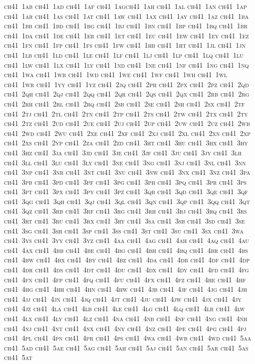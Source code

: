 \documentclass[12pt,a4paper]{article}
\begin{document}
\textsc{\lowercase{%
CH41~1AB	CH41~1AD	CH41~1AF	CH41~1AG\quad{}CH41~1AH	CH41~1AL
CH41~1AN	CH41~1AP	CH41~1AR	CH41~1AS	CH41~1AT	CH41~1AW
CH41~1AX	CH41~1AY	CH41~1AZ	CH41~1BA	CH41~1BB	CH41~1BD
CH41~1BG	CH41~1BJ	CH41~1BN	CH41~1BP	CH41~1BQ	CH41~1BR
CH41~1DA	CH41~1DE	CH41~1ER	CH41~1ET	CH41~1EU	CH41~1EW
CH41~1EY	CH41~1EZ	CH41~1FN	CH41~1FP	CH41~1FS	CH41~1FW
CH41~1HB	CH41~1HT	CH41~1JL	CH41~1JN	CH41~1LB	CH41~1LD
CH41~1LE	CH41~1LF	CH41~1LJ	CH41~1LP	CH41~1LQ	CH41~1LU
CH41~1LW	CH41~1LX	CH41~1LY	CH41~1ND	CH41~1NE	CH41~1NF
CH41~1NG	CH41~1NQ	CH41~1WA	CH41~1WB	CH41~1WD	CH41~1WE
CH41~1WF	CH41~1WH	CH41~1WL	CH41~1WR	CH41~1YY	CH41~1YZ
CH41~2JQ	CH41~2PH	CH41~2PX	CH41~2PZ	CH41~2QD	CH41~2QH
CH41~2QJ	CH41~2QQ	CH41~2QR	CH41~2QS	CH41~2QX	CH41~2RB
CH41~2RG	CH41~2RH	CH41~2RL	CH41~2RQ	CH41~2SB	CH41~2SE
CH41~2SH	CH41~2SX	CH41~2TF	CH41~2TJ	CH41~2TL	CH41~2TN
CH41~2TP	CH41~2TS	CH41~2TW	CH41~2TX	CH41~2TY	CH41~2TZ
CH41~2UD	CH41~2UE	CH41~2UJ	CH41~2UP	CH41~2UW	CH41~2UZ
CH41~2WB	CH41~2WD	CH41~2WU	CH41~2XE	CH41~2XF	CH41~2XJ
CH41~2XL	CH41~2XN	CH41~2XP	CH41~2XS	CH41~2YP	CH41~2ZA
CH41~2ZD	CH41~3HT	CH41~3HU	CH41~3HX	CH41~3HY	CH41~3HZ
CH41~3JA	CH41~3JD	CH41~3JE	CH41~3JF	CH41~3JU	CH41~3JY
CH41~3LH	CH41~3LL	CH41~3LU	CH41~3LY	CH41~3NE	CH41~3NG
CH41~3NJ	CH41~3NL	CH41~3NN	CH41~3NP	CH41~3NR	CH41~3NT
CH41~3NU	CH41~3NW	CH41~3NX	CH41~3NZ	CH41~3PA	CH41~3PB
CH41~3PD	CH41~3PF	CH41~3PG	CH41~3PH	CH41~3PQ	CH41~3PR
CH41~3PS	CH41~3PT	CH41~3PX	CH41~3PY	CH41~3PZ	CH41~3QB
CH41~3QD	CH41~3QE	CH41~3QF	CH41~3QG	CH41~3QH	CH41~3QJ
CH41~3QL	CH41~3QN	CH41~3QP	CH41~3QQ	CH41~3QT	CH41~3QZ
CH41~3RB	CH41~3RF	CH41~3RG	CH41~3RH	CH41~3RJ	CH41~3RQ
CH41~3RS	CH41~3RT	CH41~3RU	CH41~3RX	CH41~3RY	CH41~3SA
CH41~3SB	CH41~3SD	CH41~3SE	CH41~3SG	CH41~3SH	CH41~3SP
CH41~3SS	CH41~3ST	CH41~3SU	CH41~3SX	CH41~3WA	CH41~3YS
CH41~3YY	CH41~3YZ	CH41~4AA	CH41~4AG	CH41~4AH	CH41~4AQ
CH41~4AU	CH41~4AX	CH41~4BB	CH41~4BE	CH41~4BG	CH41~4BH
CH41~4BQ	CH41~4BR	CH41~4BS	CH41~4BW	CH41~4BX	CH41~4BY
CH41~4BZ	CH41~4DA	CH41~4DB	CH41~4DF	CH41~4DP	CH41~4DR
CH41~4DS	CH41~4DT	CH41~4DU	CH41~4DX	CH41~4DY	CH41~4FD
CH41~4FG	CH41~4FN	CH41~4FP	CH41~4FQ	CH41~4FU	CH41~4FX
CH41~4FZ	CH41~4HE	CH41~4HF	CH41~4HG	CH41~4HH	CH41~4HN
CH41~4HW	CH41~4JB	CH41~4JF	CH41~4JG	CH41~4JH	CH41~4JJ
CH41~4JN	CH41~4JQ	CH41~4JT	CH41~4JU	CH41~4JW	CH41~4JX
CH41~4JY	CH41~4JZ	CH41~4LA	CH41~4LB	CH41~4LE	CH41~4LG
CH41~4LQ	CH41~4LR	CH41~4LW	CH41~4LX	CH41~4LY	CH41~4LZ
CH41~4NA	CH41~4NB	CH41~4NF	CH41~4NG	CH41~4NH	CH41~4NJ
CH41~4NT	CH41~4NX	CH41~4NY	CH41~4NZ	CH41~4PE	CH41~4PG
CH41~4PJ	CH41~4PL	CH41~4PN	CH41~4PR	CH41~4PS	CH41~4WA
CH41~4WB	CH41~4WD	CH41~5AA	CH41~5AD	CH41~5AE	CH41~5AG
CH41~5AH	CH41~5AJ	CH41~5AN	CH41~5AR	CH41~5AS	CH41~5AT
}}
\end{document}
